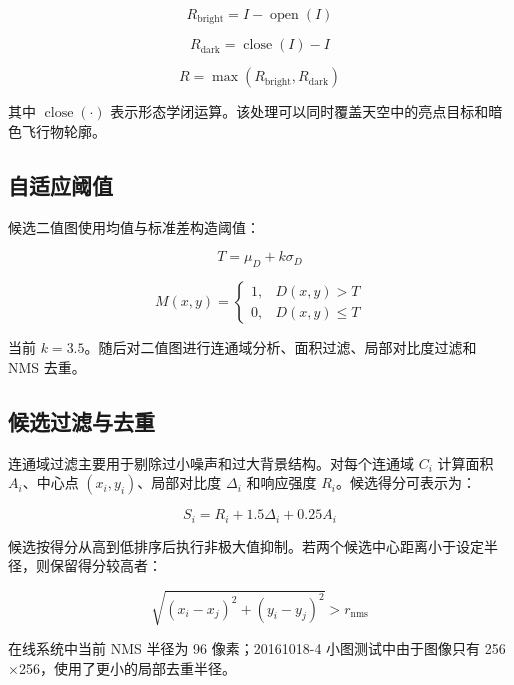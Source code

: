 \documentclass[UTF8,a4paper,12pt]{ctexart}
\begin{document}
\[
  R_{\mathrm{bright}} = I - \operatorname{open}(I)
\]

\[
  R_{\mathrm{dark}} = \operatorname{close}(I) - I
\]

\[
  R = \max(R_{\mathrm{bright}}, R_{\mathrm{dark}})
\]

其中 $\operatorname{close}(\cdot)$ 表示形态学闭运算。该处理可以同时覆盖天空中的亮点目标和暗色飞行物轮廓。

\subsection{自适应阈值}

候选二值图使用均值与标准差构造阈值：

\[
  T = \mu_D + k\sigma_D
\]

\[
  M(x,y) =
  \begin{cases}
    1, & D(x,y) > T \\
    0, & D(x,y) \leq T
  \end{cases}
\]

当前 $k=3.5$。随后对二值图进行连通域分析、面积过滤、局部对比度过滤和 NMS 去重。

\subsection{候选过滤与去重}

连通域过滤主要用于剔除过小噪声和过大背景结构。对每个连通域 $C_i$ 计算面积 $A_i$、中心点 $(x_i,y_i)$、局部对比度 $\Delta_i$ 和响应强度 $R_i$。候选得分可表示为：

\[
  S_i = R_i + 1.5\Delta_i + 0.25A_i
\]

候选按得分从高到低排序后执行非极大值抑制。若两个候选中心距离小于设定半径，则保留得分较高者：

\[
  \sqrt{(x_i-x_j)^2+(y_i-y_j)^2} > r_{\mathrm{nms}}
\]

在线系统中当前 NMS 半径为 96 像素；20161018-4 小图测试中由于图像只有 256$\times$256，使用了更小的局部去重半径。
\end{document}
